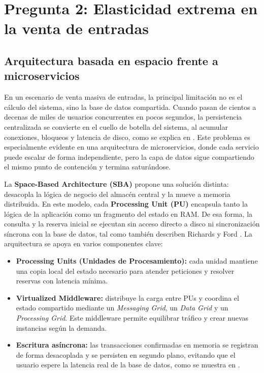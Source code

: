 \section{Pregunta 2: Elasticidad extrema en la venta de entradas}

\subsection{Arquitectura basada en espacio frente a microservicios}
En un escenario de venta masiva de entradas, la principal limitación no es el cálculo del sistema, sino la base de datos compartida. Cuando pasan de cientos a decenas de miles de usuarios concurrentes en pocos segundos, la persistencia centralizada se convierte en el cuello de botella del sistema, al acumular conexiones, bloqueos y latencia de disco, como se explica en \parencite{richards2020fundamentals}. Este problema es especialmente evidente en una arquitectura de microservicios, donde cada servicio puede escalar de forma independiente, pero la capa de datos sigue compartiendo el mismo punto de contención y termina saturándose.

La \textbf{Space-Based Architecture (SBA)} propone una solución distinta: desacopla la lógica de negocio del almacén central y la mueve a memoria distribuida. En este modelo, cada \textbf{Processing Unit (PU)} encapsula tanto la lógica de la aplicación como un fragmento del estado en RAM. De esa forma, la consulta y la reserva inicial se ejecutan sin acceso directo a disco ni sincronización síncrona con la base de datos, tal como también describen Richards y Ford \parencite{richards2020fundamentals}. La arquitectura se apoya en varios componentes clave:

\begin{itemize}
    \item \textbf{Processing Units (Unidades de Procesamiento):} cada unidad mantiene una copia local del estado necesario para atender peticiones y resolver reservas con latencia mínima.
    \item \textbf{Virtualized Middleware:} distribuye la carga entre PUs y coordina el estado compartido mediante un \emph{Messaging Grid}, un \emph{Data Grid} y un \emph{Processing Grid}. Este middleware permite equilibrar tráfico y crear nuevas instancias según la demanda.
    \item \textbf{Escritura asíncrona:} las transacciones confirmadas en memoria se registran de forma desacoplada y se persisten en segundo plano, evitando que el usuario espere la latencia real de la base de datos, como se muestra en \parencite{richards2020fundamentals}.
\end{itemize}

